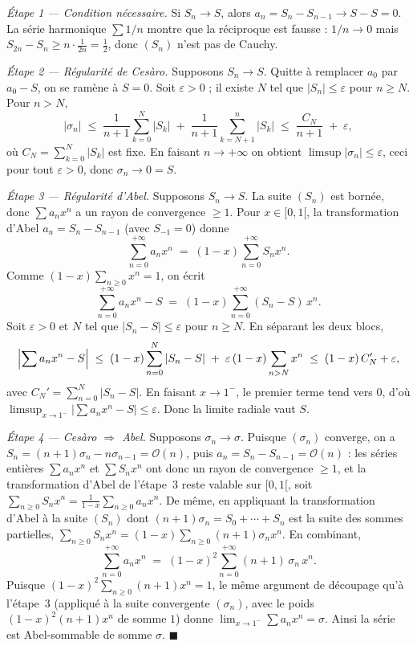 \begin{mdframed}[style=proofbar]
  \textit{Étape 1 — Condition nécessaire.}
  Si $S_n\to S$, alors $a_n=S_n-S_{n-1}\to S-S=0$. La série harmonique
  $\sum 1/n$ montre que la réciproque est fausse : $1/n\to 0$ mais
  $S_{2n}-S_n\geq n\cdot\tfrac{1}{2n}=\tfrac12$, donc $(S_n)$ n'est pas de
  Cauchy.

  \medskip
  \textit{Étape 2 — Régularité de Cesàro.}
  Supposons $S_n\to S$. Quitte à remplacer $a_0$ par $a_0-S$, on se ramène à
  $S=0$. Soit $\varepsilon>0$ ; il existe $N$ tel que $|S_n|\leq\varepsilon$
  pour $n\geq N$. Pour $n>N$,
  \[
    |\sigma_n|
    \;\leq\; \frac{1}{n+1}\sum_{k=0}^{N}|S_k|
      \;+\; \frac{1}{n+1}\sum_{k=N+1}^{n}|S_k|
    \;\leq\; \frac{C_N}{n+1} \;+\; \varepsilon ,
  \]
  où $C_N=\sum_{k=0}^{N}|S_k|$ est fixe. En faisant $n\to+\infty$ on obtient
  $\limsup|\sigma_n|\leq\varepsilon$, ceci pour tout $\varepsilon>0$, donc
  $\sigma_n\to 0=S$.

  \medskip
  \textit{Étape 3 — Régularité d'Abel.}
  Supposons $S_n\to S$. La suite $(S_n)$ est bornée, donc $\sum a_n x^n$ a un
  rayon de convergence $\geq 1$. Pour $x\in[0,1[$, la transformation d'Abel
  $a_n=S_n-S_{n-1}$ (avec $S_{-1}=0$) donne
  \[
    \sum_{n=0}^{+\infty} a_n x^n
    \;=\; (1-x)\sum_{n=0}^{+\infty} S_n x^n .
  \]
  Comme $(1-x)\sum_{n\geq 0} x^n = 1$, on écrit
  \[
    \sum_{n=0}^{+\infty} a_n x^n - S
    \;=\; (1-x)\sum_{n=0}^{+\infty} (S_n-S)\,x^n .
  \]
  Soit $\varepsilon>0$ et $N$ tel que $|S_n-S|\leq\varepsilon$ pour $n\geq N$.
  En séparant les deux blocs,
  \[
    \Bigl|\sum a_n x^n - S\Bigr|
    \;\leq\; (1-x)\sum_{n=0}^{N}|S_n-S|
      \;+\; \varepsilon\,(1-x)\sum_{n>N} x^n
    \;\leq\; (1-x)\,C_N' + \varepsilon ,
  \]
  avec $C_N'=\sum_{n=0}^{N}|S_n-S|$. En faisant $x\to 1^{-}$, le premier terme
  tend vers $0$, d'où $\limsup_{x\to 1^-}|\sum a_n x^n-S|\leq\varepsilon$. Donc
  la limite radiale vaut $S$.

  \medskip
  \textit{Étape 4 — Cesàro $\Rightarrow$ Abel.}
  Supposons $\sigma_n\to\sigma$. Puisque $(\sigma_n)$ converge, on a
  $S_n=(n+1)\sigma_n-n\sigma_{n-1}=\mathcal{O}(n)$, puis
  $a_n=S_n-S_{n-1}=\mathcal{O}(n)$ : les séries entières $\sum a_n x^n$ et
  $\sum S_n x^n$ ont donc un rayon de convergence $\geq 1$, et la
  transformation d'Abel de l'étape~3 reste valable sur $[0,1[$, soit
  $\sum_{n\geq 0}S_n x^n
  =\tfrac{1}{1-x}\sum_{n\geq 0}a_n x^n$. De même, en appliquant la
  transformation d'Abel à la suite $(S_n)$ dont $(n+1)\sigma_n=S_0+\cdots+S_n$
  est la suite des sommes partielles,
  $\sum_{n\geq 0}S_n x^n=(1-x)\sum_{n\geq 0}(n+1)\sigma_n x^n$. En combinant,
  \[
    \sum_{n=0}^{+\infty} a_n x^n
    \;=\; (1-x)^{2}\sum_{n=0}^{+\infty} (n+1)\,\sigma_n\, x^n .
  \]
  Puisque $(1-x)^2\sum_{n\geq 0}(n+1)x^n=1$, le même argument de découpage qu'à
  l'étape~3 (appliqué à la suite convergente $(\sigma_n)$, avec le poids
  $(1-x)^2(n+1)x^n$ de somme $1$) donne
  $\lim_{x\to1^-}\sum a_n x^n=\sigma$. Ainsi la série est Abel-sommable de
  somme $\sigma$.
  \hfill$\blacksquare$
\end{mdframed}

